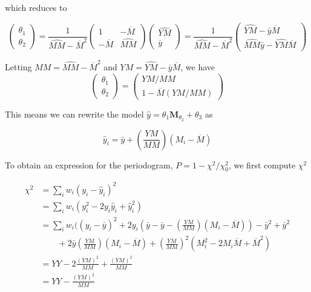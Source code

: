 \documentclass[apj]{emulateapj}
\newcommand{\Mshft}{\mathbf{M}_{\theta_2}}
\newcommand{\MMhat}{\widehat{MM}}
\newcommand{\YMhat}{\widehat{YM}}
\newcommand{\Mbar}{\overline{M}}
\begin{document}
\begin{appendix}
which reduces to 

\begin{equation}
\begin{pmatrix} \theta_1 \\ \theta_2 \end{pmatrix}
= 
\frac{1}{\MMhat - \Mbar^2}
\begin{pmatrix} 1 & -\Mbar \\ -\Mbar & \MMhat \end{pmatrix}
\begin{pmatrix} \YMhat \\ \bar{y}\end{pmatrix}
= 
\frac{1}{\MMhat - \Mbar^2}
\begin{pmatrix} \YMhat - \bar{y}\Mbar \\ \MMhat\bar{y} - \YMhat\Mbar \end{pmatrix}
\end{equation}

Letting $MM = \MMhat - \Mbar^2$ and $YM = \YMhat - \bar{y}\Mbar$, we have
\begin{equation}
\begin{pmatrix} \theta_1 \\ \theta_2 \end{pmatrix}
= 
\begin{pmatrix} YM / MM \\ 1 - \Mbar (YM / MM)\end{pmatrix}
\end{equation}

This means we can rewrite the model $\hat{y} = \theta_1\Mshft + \theta_3$ as 

\begin{equation}
\hat{y}_i = \bar{y} + \left(\frac{YM}{MM}\right)(M_i - \Mbar)
\end{equation}

To obtain an expression for the periodogram, $P = 1 - \chi^2 / \chi^2_0$, we first compute $\chi^2$

\begin{align}
\chi^2 &= \sum_i w_i (y_i - \hat{y}_i)^2 \\
       &= \sum_i w_i (y_i^2 - 2y_i\hat{y}_i + \hat{y}_i^2)\\
       &= \sum_i w_i ((y_i - \bar{y})^2 + 2y_i(\bar{y} - \bar{y} - \left(\frac{YM}{MM}\right)(M_i - \Mbar)) - \bar{y}^2 + \bar{y}^2 \\
       &\qquad + 2\bar{y}\left(\frac{YM}{MM}\right)(M_i - \Mbar) + \left(\frac{YM}{MM}\right)^2(M_i^2 - 2M_i\Mbar + \Mbar^2)\\
       &= YY - 2\frac{(YM)^2}{MM} + \frac{(YM)^2}{MM}\\
       &= YY - \frac{(YM)^2}{MM}
\end{align}


\end{appendix}
\end{document}
